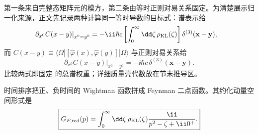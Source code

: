 第一条来自完整态矩阵元的模方，第二条由等时正则对易关系固定。为清楚展示归一化来源，正文先记录两种计算同一等时导数的目标式：谱表示给
\begin{align}
 \left.\partial_{x^0}C(x-y)\right|_{x^0=y^0}
 &=-\ii\hbar c
 \left[\int_0^\infty\dd\zeta\,\rho_{\rm KL}(\zeta)\right]
 \delta^{(3)}(\mathbf x-\mathbf y),
 \label{eq:KL-commutator-spectral-derivative-r15}
\end{align}
而 $C(x-y)\equiv\langle\Omega|[\hat\varphi(x),\hat\varphi(y)]|\Omega\rangle$ 与正则对易关系给
\begin{equation}
 \left.\partial_{x^0}C(x-y)\right|_{x^0=y^0}
 =-\ii\hbar c\,\delta^{(3)}(\mathbf x-\mathbf y).
 \label{eq:KL-commutator-canonical-r15}
\end{equation}
比较两式即固定 的总谱权重；详细质量壳代数放在节末推导区。

时间排序把正、负时间的 Wightman 函数拼成 Feynman 二点函数。其约化动量空间形式是
\begin{equation}
 \boxed{
 G_{F,\rm red}(p)
 =\int_0^\infty\dd\zeta\,
 \rho_{\rm KL}(\zeta)
 \frac{\ii}{p^2-\zeta+\ii0^+}.}
 \label{eq:KL-SI-r12}
\end{equation}

